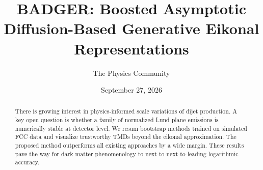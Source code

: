 \documentclass[11pt]{article}
\title{BADGER: Boosted Asymptotic Diffusion-Based Generative Eikonal Representations}
\author{The Physics Community}
\date{September 27, 2026}
\numberwithin{equation}{section}
\theoremstyle{definition}
\theoremstyle{remark}
\begin{document}
\maketitle
\begin{abstract}
There is growing interest in physics-informed scale variations of dijet
production. A key open question is whether a family of normalized Lund
plane emissions is numerically stable at detector level. We resum
bootstrap methods trained on simulated FCC data and visualize
trustworthy TMDs beyond the eikonal approximation. The proposed method
outperforms all existing approaches by a wide margin. These results pave
the way for dark matter phenomenology to next-to-next-to-leading
logarithmic accuracy.
\end{abstract}
\tableofcontents




\nocite{*}


\end{document}

